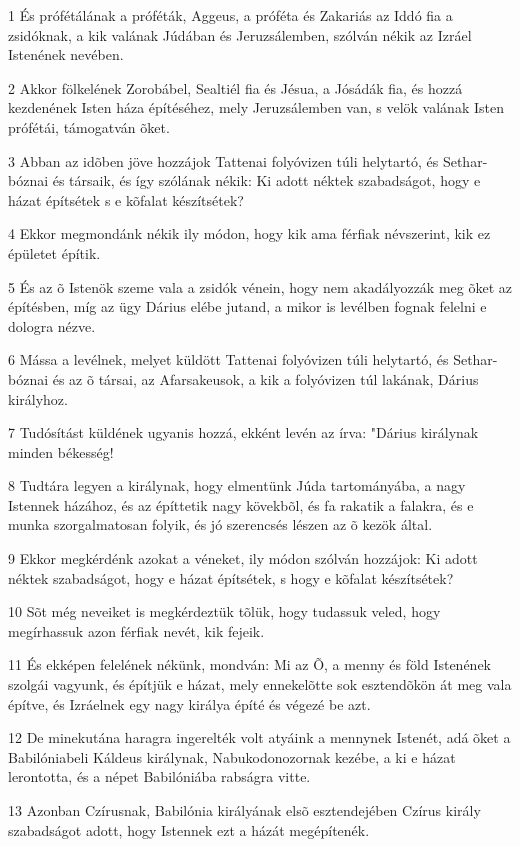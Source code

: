 \par 1 És prófétálának a próféták, Aggeus, a próféta és Zakariás az  Iddó fia a zsidóknak, a kik valának Júdában és Jeruzsálemben, szólván nékik az Izráel Istenének nevében.
\par 2 Akkor fölkelének Zorobábel, Sealtiél fia és Jésua, a Jósádák fia, és hozzá kezdenének Isten háza építéséhez, mely Jeruzsálemben van, s velök valának Isten prófétái, támogatván õket.
\par 3 Abban az idõben jöve hozzájok Tattenai folyóvizen túli helytartó, és Sethar-bóznai és társaik, és így szólának nékik: Ki adott néktek szabadságot, hogy e házat építsétek s e kõfalat készítsétek?
\par 4 Ekkor megmondánk nékik ily módon, hogy kik ama férfiak névszerint, kik ez épületet építik.
\par 5 És az õ Istenök szeme vala a zsidók vénein, hogy nem akadályozzák meg õket az építésben, míg az ügy Dárius elébe jutand, a mikor is levélben fognak felelni e dologra nézve.
\par 6 Mássa a levélnek, melyet küldött Tattenai folyóvizen túli helytartó, és Sethar-bóznai és az õ társai, az Afarsakeusok, a kik a folyóvizen túl lakának, Dárius királyhoz.
\par 7 Tudósítást küldének ugyanis hozzá, ekként levén az írva: "Dárius királynak minden békesség!
\par 8 Tudtára legyen a királynak, hogy elmentünk Júda tartományába, a nagy Istennek házához, és az építtetik nagy kövekbõl, és fa rakatik a falakra, és e munka szorgalmatosan folyik, és jó szerencsés lészen az õ kezök által.
\par 9 Ekkor megkérdénk azokat a véneket, ily módon szólván hozzájok: Ki adott néktek szabadságot, hogy e házat építsétek, s hogy e kõfalat készítsétek?
\par 10 Sõt még neveiket is megkérdeztük tõlük, hogy tudassuk veled, hogy megírhassuk azon férfiak nevét, kik fejeik.
\par 11 És ekképen felelének nékünk, mondván: Mi az Õ, a menny és föld Istenének szolgái vagyunk, és építjük e házat, mely ennekelõtte sok esztendõkön át meg vala építve, és Izráelnek egy nagy királya építé és végezé be azt.
\par 12 De minekutána haragra ingerelték volt atyáink a mennynek Istenét, adá õket a Babilóniabeli Káldeus királynak, Nabukodonozornak kezébe, a ki e házat lerontotta, és a népet Babilóniába rabságra vitte.
\par 13 Azonban Czírusnak, Babilónia királyának elsõ esztendejében Czírus király szabadságot adott, hogy Istennek ezt a házát megépítenék.
